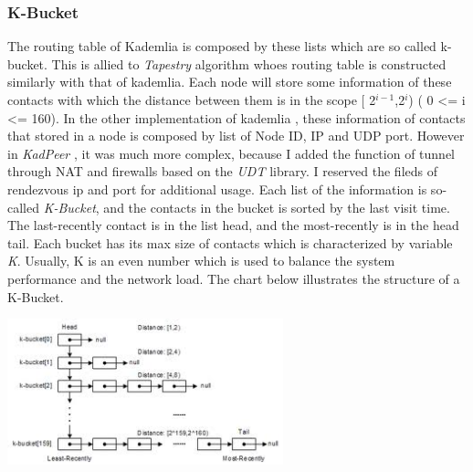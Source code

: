 \subsubsection{K-Bucket}
{
The routing table of Kademlia is composed by these lists which are so called k-bucket.
This is allied to \emph{Tapestry} algorithm whoes routing table is constructed similarly with that of kademlia.
Each node will store some information of these contacts with which the distance between them is in the scope [ 2$^{i-1}$,2$^{i}$) ( 0 \textless= i \textless= 160).
In the other implementation of kademlia , these information of contacts that stored in a node is composed by list of Node ID, IP and UDP port.
However in \emph{KadPeer} , it was much more complex, because I added the function of tunnel through NAT and firewalls based on the \emph{UDT} library.
I reserved the fileds of rendezvous ip and port for additional usage.
Each list of the information is so-called \emph{K-Bucket}, and the contacts in the bucket is sorted by the last visit time.
The last-recently contact is in the list head, and the most-recently is in the head tail.
Each bucket has its max size of contacts which is characterized by variable \emph{K}.
Usually, K is an even number which is used to balance the system performance and the network load.
The chart below illustrates the structure of a K-Bucket.
\begin{center}
\includegraphics[width=8cm]{data/kbucket.jpg}
\end{center}

}
